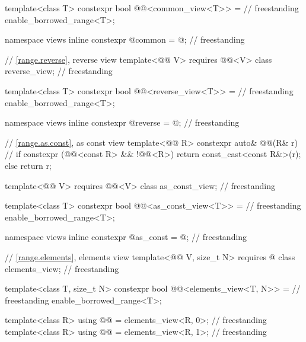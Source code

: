 \begin{codeblock}
{  template<class T>
    constexpr bool @@<common_view<T>> =                          // freestanding
      enable_borrowed_range<T>;

  namespace views { inline constexpr @\unspecnc@ common = @\unspecnc@; }            // freestanding

  // \ref{range.reverse}, reverse view
  template<@@ V>
    requires @@<V>
  class reverse_view;                                                               // freestanding

  template<class T>
    constexpr bool @@<reverse_view<T>> =                         // freestanding
      enable_borrowed_range<T>;

  namespace views { inline constexpr @\unspecnc@ reverse = @\unspecnc@; }           // freestanding

  // \ref{range.as.const}, as const view
  template<@@ R>
    constexpr auto& @@(R& r) {          // \expos
      if constexpr (@@<const R> && !@@<R>) {
        return const_cast<const R&>(r);
      } else {
        return r;
      }
    }

  template<@@ V>
    requires @@<V>
  class as_const_view;                                                              // freestanding

  template<class T>
    constexpr bool @@<as_const_view<T>> =                        // freestanding
      enable_borrowed_range<T>;

  namespace views { inline constexpr @\unspecnc@ as_const = @\unspecnc@; }          // freestanding

  // \ref{range.elements}, elements view
  template<@@ V, size_t N>
    requires @\seebelow@
  class elements_view;                                                              // freestanding

  template<class T, size_t N>
    constexpr bool @@<elements_view<T, N>> =                     // freestanding
      enable_borrowed_range<T>;

  template<class R>
    using @@ = elements_view<R, 0>;                                          // freestanding
  template<class R>
    using @@ = elements_view<R, 1>;                                        // freestanding

}
\end{codeblock}
